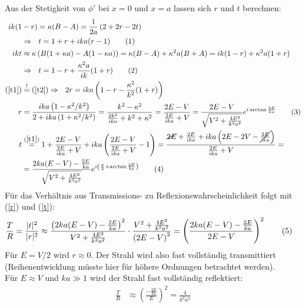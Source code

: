 \documentclass[a4paper,12pt]{article}
\newcommand\numberthis{\addtocounter{equation}{1}\tag{\theequation}}
\newcommand{\kla}{}
\begin{document}
Aus der Stetigkeit von $\phi'$ bei $x=0$ und $x=a$ lassen sich $r$ und $t$ berechnen:
\begin{align*}
ik (1&-r)=\kappa (B-A)=\frac{1}{2a}\kla\left( {2+2r-2t} \right)\\
&\Rightarrow\ \ t=1+r+ika(r-1)\numberthis\label{t1} \\
ikt&\approx\kappa\kla\left( {B(1+\kappa a)-A(1-\kappa a)} \right)=\kappa (B-A)+\kappa^2a(B+A)=ik(1-r)+\kappa^2a(1+r) \\
&\Rightarrow\ \ t=1-r+\frac{\kappa^2a}{ik}(1+r)\numberthis\label{t2} \\
(\ref{t1})&\overset{!}{=}(\ref{t2})\Rightarrow\ \ 2r=ika\kla\left( {1-r-\frac{\kappa^2}{k^2}(1+r)} \right)\\ 
r&=\frac{ika\kla\left( {1-\kappa^2/k^2} \right)}{2+ika\kla\left( {1+\kappa^2/k^2} \right)}=\frac{k^2-\kappa^2}{\frac{2k^2}{ika}+k^2+\kappa^2}=\frac{2E-V}{\frac{2E}{ika}+V}=\frac{2E-V}{\sqrt{V^2+\frac{4E^2}{k^2a^2}}}e^{i\arctan\frac{2E}{ka}}\numberthis\label{r}\\
t&\overset{(\ref{t1})}{=}1+\frac{2E-V}{\frac{2E}{ika}+V}+ika\kla\left( {\frac{2E-V}{\frac{2E}{ika}+V}-1} \right)=\frac{\cancel{2E}+\frac{2E}{ika}+ika\kla\left( {2E-2V-\cancel{\frac{2E}{ika}}} \right)}{\frac{2E}{ika}+V}= \\
&=\frac{2ka(E-V)-\frac{2E}{ka}}{\sqrt{V^2+\frac{4E^2}{k^2a^2}}}e^{i\kla\left( {\frac{\pi}{2}+\arctan\frac{2E}{ka}} \right)} \numberthis\label{t}
\end{align*}
Für das Verhältnis aus Transmissions- zu Reflexionswahrscheinlichkeit folgt mit (\ref{r}) und (\ref{t}):
\begin{align*}
\frac{T}{R}&=\frac{|t|^2}{|r|^2}\approx\frac{\kla\left( {2ka(E-V)-\frac{2E}{ka}} \right)^2}{V^2+\frac{4E^2}{k^2a^2}}\cdot\frac{V^2+\frac{4E^2}{k^2a^2}}{\kla\left( {2E-V} \right)^2}=\kla\left( {\frac{2ka(E-V)-\frac{2E}{ka}}{2E-V}} \right)^2\numberthis\label{T/R}
\end{align*}
Für $E=V/2$ wird $r\approx 0$. Der Strahl wird also fast vollständig transmittiert (Reihenentwicklung müsste hier für höhere Ordnungen betrachtet werden).\\
Für $E\approx V$ und $ka \gg 1$ wird der Strahl fast vollständig reflektiert:
\begin{align*}
\frac{T}{R}&\approx \kla\left( {\frac{-\frac{2E}{ka}}{E}} \right)^2=\frac{4}{k^2a^2}
\end{align*}
\end{document}
